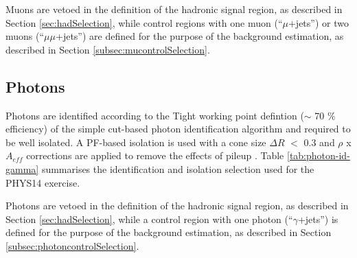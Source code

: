 
Muons are vetoed in the definition of the hadronic signal region, 
as described in Section \ref{sec:hadSelection}, while 
control regions with one muon (``$\mu$+jets'') or two muons (``$\mu\mu$+jets'') are defined for the purpose of the background estimation, 
as described in Section \ref{subsec:mucontrolSelection}.




\subsection{Photons}
\label{sec:photon-id}
Photons are identified according to the Tight working point defintion ($\sim$ 70 $\%$ efficiency) 
of the simple cut-based photon identification algorithm \cite{photon-id} 
and required to be well isolated. 
A PF-based isolation is used with a cone size $\Delta R$ $<$ 0.3 and $\rho$ x $A_{eff}$ corrections are applied to remove the effects of pileup \cite{pf-photon}. 
Table \ref{tab:photon-id-gamma} summarises the identification and isolation selection used for the PHYS14 exercise. 

Photons are vetoed in the definition of the hadronic signal region, 
as described in Section \ref{sec:hadSelection}, while a 
control region with one photon (``$\gamma$+jets'') is defined for the purpose of the background estimation, 
as described in Section \ref{subsec:photoncontrolSelection}.


